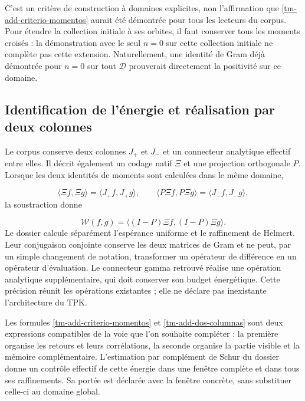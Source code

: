 C'est un critère de construction à domaines explicites, non l'affirmation que \eqref{tm-add-criterio-momentos} aurait été démontrée pour tous les lecteurs du corpus. Pour étendre la collection initiale à ses orbites, il faut conserver tous les moments croisés : la démonstration avec le seul \(n=0\) sur cette collection initiale ne complète pas cette extension. Naturellement, une identité de Gram déjà démontrée pour \(n=0\) sur tout \(\mathcal D\) prouverait directement la positivité sur ce domaine.


\subsection{Identification de l'énergie et réalisation par deux colonnes}
\label{tm-add-c6}
Le corpus conserve deux colonnes \(J_+\) et \(J_-\) et un connecteur analytique effectif entre elles. Il décrit également un codage natif \(\Xi\) et une projection orthogonale \(P\). Lorsque les deux identités de moments sont calculées dans le même domaine,

\[
\langle\Xi f,\Xi g\rangle=\langle J_+f,J_+g\rangle,
\qquad
\langle P\Xi f,P\Xi g\rangle=\langle J_-f,J_-g\rangle,
\]
la soustraction donne

\begin{equation}
\mathscr W(f,g)=\langle(I-P)\Xi f,(I-P)\Xi g\rangle.
\label{tm-add-dos-columnas}
\end{equation}
Le dossier calcule séparément l'espérance uniforme et le raffinement de Helmert. Leur conjugaison conjointe conserve les deux matrices de Gram et ne peut, par un simple changement de notation, transformer un opérateur de différence en un opérateur d'évaluation. Le connecteur gamma retrouvé réalise une opération analytique supplémentaire, qui doit conserver son budget énergétique. Cette précision réunit les opérations existantes ; elle ne déclare pas inexistante l'architecture du TPK.

Les formules \eqref{tm-add-criterio-momentos} et \eqref{tm-add-dos-columnas} sont deux expressions compatibles de la voie que l'on souhaite compléter : la première organise les retours et leurs corrélations, la seconde organise la partie visible et la mémoire complémentaire. L'estimation par complément de Schur du dossier donne un contrôle effectif de cette énergie dans une fenêtre complète et dans tous ses raffinements. Sa portée est déclarée avec la fenêtre concrète, sans substituer celle-ci au domaine global.


